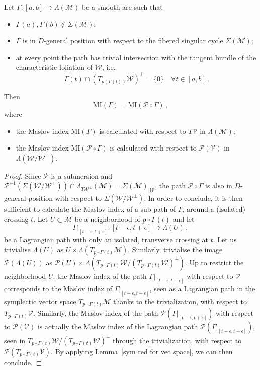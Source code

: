 \documentclass[AHL, Unicode, longabstracts, published]{cedram}
\renewcommand*\P{\mathcal{P}}
\newcommand*\M{\mathcal{M}}
\newcommand*\cw{\mathcal{W}}
\newcommand*\cv{\mathcal{V}}
\newcommand*\cal{\mathcal}
\newcommand{\MI}{\mathrm{MI}}
\let\oldforall\forall
\renewcommand*{\forall}{\mathrel{\oldforall}}
\begin{document}
\break
\begin{lemm}\label{lemma almost Viterbo}
Let $\Gamma:[a,b]\to \Lambda(\M)$ be a smooth arc such that
\begin{itemize}
\item $\Gamma(a),\Gamma(b)\notin \Sigma(\M)$;
\item {$\Gamma$ is in $D$-general position with respect to the fibered singular cycle $\Sigma(\M)$;}
\item at every point the path has trivial intersection with the tangent bundle of the characteristic foliation of $\cal W$, i.e.
\[
\Gamma(t)\cap \left(T_{p(\Gamma(t))}\cal W\right)^\perp=\{0\}\quad\forall t\in[a,b]\,.
\]
\end{itemize}
Then
\[
\MI(\Gamma)= \MI(\P\circ\Gamma)\,,
\]
where
\begin{itemize}
\item the Maslov index $ \MI(\Gamma)$ is calculated with respect to $T\cal V$ in $\Lambda(\M)$;
\item the Maslov index $ \MI(\P\circ\Gamma)$ is calculated with respect to $\P(\cal V)$ in $
\Lambda(\cal W/\cal W^\bot)$.
\end{itemize}
\end{lemm}

\begin{proof}
Since $\P$ is a submersion and $\P^{-1}(\Sigma(\cal W/\cal W^\bot))\cap \Lambda_{T\cal W^\bot}(\M)=\Sigma(\M)_{|\cal W}$, the path $\P\circ\Gamma$ is also in $D$-general position with respect to $\Sigma(\cal W/\cal W^\bot)$. In order to conclude, it is then sufficient to calculate the Maslov index of a sub-path of $\Gamma$, around a (isolated) crossing $t$. Let $U\subset\M$ be a neighborhood of $p\circ\Gamma(t)$ and let
\[
\Gamma\vert_{[t-\epsilon,t+\epsilon]}:[t-\epsilon,t+\epsilon]\to \Lambda(U)\,,
\]
be a Lagrangian path with only an isolated, transverse crossing at $t$. Let us trivialise $\Lambda(U)$ as $U\times \Lambda(T_{p\circ\Gamma(t)}\M)$. Similarly, trivialise the image $\P(\Lambda(U))$ as $\P(U)\times \Lambda(T_{p\circ\Gamma(t)}\cw/(T_{p\circ\Gamma(t)}\cw)^\perp)$. Up to restrict the neighborhood $U$, the Maslov index of the path $\Gamma\vert_{[t-\epsilon,t+\epsilon]}$ with respect to $\cv$ corresponds to the Maslov index of $\Gamma\vert_{[t-\epsilon,t+\epsilon]}$, seen as a Lagrangian path in the symplectic vector space $T_{p\circ\Gamma(t)}\M$ thanks to the trivialization, with respect to $T_{p\circ\Gamma(t)}\cv$. Similarly, the Maslov index of the path $\P(\Gamma\vert_{[t-\epsilon,t+\epsilon]})$ with respect to $\P(\cv)$ is actually the Maslov index of the Lagrangian path $\P(\Gamma\vert_{[t-\epsilon,t+\epsilon]})$, seen in $T_{p\circ\Gamma(t)}\cw/(T_{p\circ\Gamma(t)}\cw)^\perp$ through the trivialization, with respect to $\P(T_{p\circ\Gamma(t)}\cv)$. By applying Lemma~\ref{sym red for vec space}, we can then conclude.
\end{proof}
\end{document}
